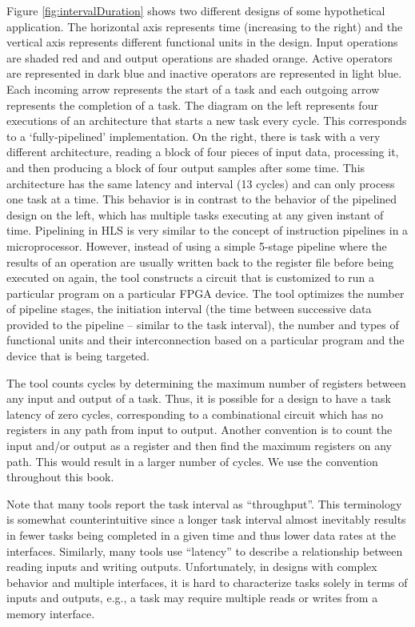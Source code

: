 Figure \ref{fig:intervalDuration} shows two different designs of some hypothetical application.   The horizontal axis represents time (increasing to the right) and the vertical axis represents different functional units in the design.  Input operations are shaded red and and output operations are shaded orange.  Active operators are represented in dark blue and inactive operators are represented in light blue.  Each incoming arrow represents the start of a task and each outgoing arrow represents the completion of a task.  The diagram on the left represents four executions of an architecture that starts a new task every cycle. This corresponds to a `fully-pipelined' implementation. On the right, there is task with a very different architecture, reading a block of four pieces of input data, processing it, and then producing a block of four output samples after some time.  This architecture has the same latency and interval (13 cycles) and can only process one task at a time.  This behavior is in contrast to the behavior of the pipelined design on the left, which has multiple tasks executing at any given instant of time.  Pipelining in HLS is very similar to the concept of instruction pipelines in a microprocessor.  However, instead of using a simple 5-stage pipeline where the results of an operation are usually written back to the register file before being executed on again, the \VHLS tool constructs a circuit that is customized to run a particular program on a particular FPGA device.  The tool optimizes the number of pipeline stages, the initiation interval (the time between successive data provided to the pipeline -- similar to the task interval), the number and types of functional units and their interconnection based on a particular program and the device that is being targeted.

The \VHLS tool counts cycles by determining the maximum number of registers between any input and output of a task. Thus, it is possible for a design to have a task latency of zero cycles, corresponding to a combinational circuit which has no registers in any path from input to output. Another convention is to count the input and/or output as a register and then find the maximum registers on any path. This would result in a larger number of cycles. We use the \VHLS convention throughout this book.

\begin{aside}
Note that many tools report the task interval as ``throughput''. This terminology is somewhat counterintuitive since a longer task interval almost inevitably results in fewer tasks being completed in a given time and thus lower data rates at the interfaces.  Similarly, many tools use ``latency'' to describe a relationship between reading inputs and writing outputs.  Unfortunately, in designs with complex behavior and multiple interfaces, it is hard to characterize tasks solely in terms of inputs and outputs, e.g., a task may require multiple reads or writes from a memory interface. 
\end{aside}



